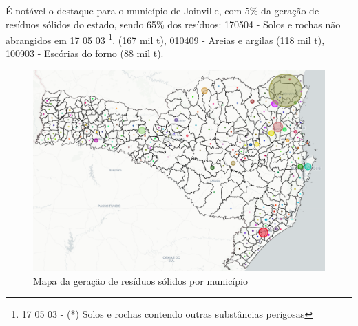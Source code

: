 É notável o destaque para o município de Joinville, com 5\% da geração de resíduos sólidos do estado, sendo 65\% dos resíduos: 170504 - Solos e rochas não abrangidos em 17 05 03 \footnote{17 05 03 - (*) Solos e rochas contendo outras substâncias perigosas}. (167 mil \gls{t}),  010409 - Areias e argilas (118 mil \gls{t}), 100903 - Escórias do forno (88 mil \gls{t}).


\begin{figure}[htb]
	\caption{\label{fig:sc-geracao} Mapa da geração de resíduos sólidos por município}
	\begin{center}
		\includegraphics[scale=0.47]{images/sc-geracao.png}
	\end{center}
\end{figure}


